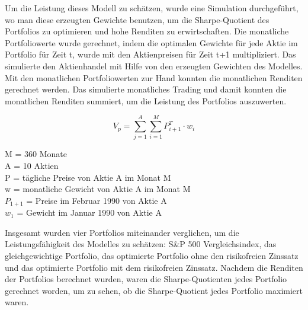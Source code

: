 \documentclass[12pt]{article}
\begin{document}
            Um die Leistung dieses Modell zu schätzen, wurde eine Simulation durchgeführt, 
            wo man diese erzeugten Gewichte benutzen, um die Sharpe-Quotient des Portfolios zu optimieren und 
            hohe Renditen zu erwirtschaften. Die monatliche Portfoliowerte wurde gerechnet, 
            indem die optimalen Gewichte für jede Aktie im Portfolio für Zeit t, 
            wurde mit den Aktienpreisen für Zeit t+1 multipliziert. 
            Das simulierte den Aktienhandel mit Hilfe von den erzeugten Gewichten des Modelles. 
            Mit den monatlichen Portfoliowerten zur Hand konnten die monatlichen Renditen gerechnet werden. 
            Das simulierte monatliches Trading und damit konnten die monatlichen Renditen summiert, 
            um die Leistung des Portfolios auszuwerten.

            \begin{Large} \[ V_p = \sum_{j=1}^{A}\sum_{i=1}^{M}P^T_{i+1} \cdot w_i \] \end{Large}

            \begin{multicols}{2}
                \begin{footnotesize}
                    
                    \noindent M = 360 Monate \\
                    A = 10 Aktien \\
                    P = tägliche Preise von Aktie A im Monat M \\
                    w = monatliche Gewicht von Aktie A im Monat M \\
                    $P_{1+1}$ = Preise im Februar 1990 von Aktie A \\
                    $w_1$ = Gewicht im Januar 1990 von Aktie A 

                \end{footnotesize}
            \end{multicols}

            Insgesamt wurden vier Portfolios miteinander verglichen, 
            um die Leistungsfähigkeit des Modelles zu schätzen: S\&P 500 Vergleichsindex, 
            das gleichgewichtige Portfolio, das optimierte Portfolio ohne den risikofreien Zinssatz und 
            das optimierte Portfolio mit dem risikofreien Zinssatz. Nachdem die Renditen der Portfolios berechnet wurden, 
            waren die Sharpe-Quotienten jedes Portfolio gerechnet worden, 
            um zu sehen, ob die Sharpe-Quotient jedes Portfolio maximiert waren.
\end{document}
